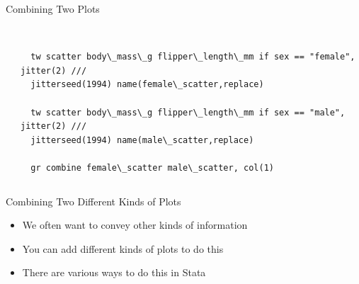 \documentclass[shownotes,12pt, aspectratio=169]{beamer}
\begin{document}
\begin{frame}[t]{Combining Two Plots}
\begin{columns}
\begin{column}[T]{.5\textwidth}
  \begin{center}
\end{center}
\end{column}
\hfill
\begin{column}[T]{.5\textwidth}
\begin{verbatim}

  tw scatter body\_mass\_g flipper\_length\_mm if sex == "female", jitter(2) ///
  jitterseed(1994) name(female\_scatter,replace)

  tw scatter body\_mass\_g flipper\_length\_mm if sex == "male", jitter(2) ///
  jitterseed(1994) name(male\_scatter,replace)

  gr combine female\_scatter male\_scatter, col(1)

\end{verbatim}
\end{column}
\end{columns}
\end{frame}


\begin{frame}[t]{Combining Two Different Kinds of Plots}
  \begin{itemize}
    \item We often want to convey other kinds of information
    \item You can add different kinds of plots to do this
    \item There are various ways to do this in Stata
  \end{itemize}
\end{frame}
\end{document}
